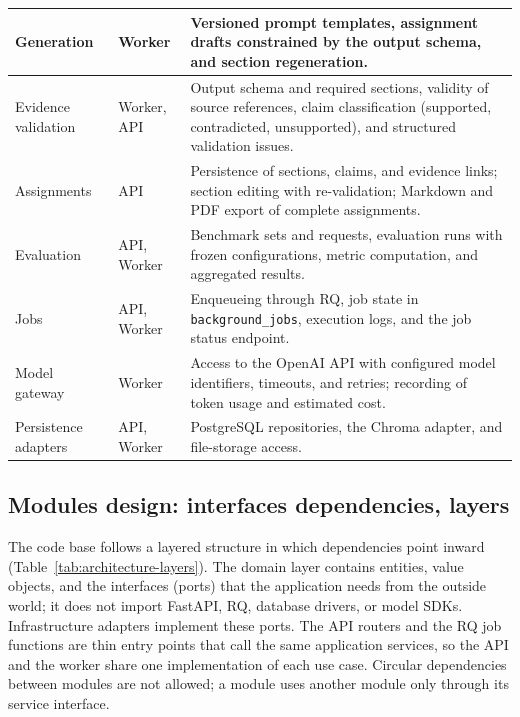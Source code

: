 \documentclass[12pt,a4paper]{article}
\begin{document}
\begin{xltabular}{\textwidth}{
    |p{32mm}|p{19mm}|X|
}
Generation &
Worker &
Versioned prompt templates, assignment drafts constrained by the
output schema, and section regeneration. \\
\hline

Evidence validation &
Worker, API &
Output schema and required sections, validity of source references,
claim classification (supported, contradicted, unsupported), and
structured validation issues. \\
\hline

Assignments &
API &
Persistence of sections, claims, and evidence links; section editing
with re-validation; Markdown and PDF export of complete
assignments. \\
\hline

Evaluation &
API, Worker &
Benchmark sets and requests, evaluation runs with frozen
configurations, metric computation, and aggregated results. \\
\hline

Jobs &
API, Worker &
Enqueueing through RQ, job state in \texttt{background\_jobs},
execution logs, and the job status endpoint. \\
\hline

Model gateway &
Worker &
Access to the OpenAI API with configured model identifiers,
timeouts, and retries; recording of token usage and estimated
cost. \\
\hline

Persistence adapters &
API, Worker &
PostgreSQL repositories, the Chroma adapter, and file-storage
access. \\
\hline

\end{xltabular}
\endgroup

\subsection{Modules design: interfaces dependencies, layers}
\label{sec:architecture-layers}

The code base follows a layered structure in which dependencies
point inward (Table~\ref{tab:architecture-layers}). The domain layer
contains entities, value objects, and the interfaces (ports) that
the application needs from the outside world; it does not import
FastAPI, RQ, database drivers, or model SDKs. Infrastructure
adapters implement these ports. The API routers and the RQ job
functions are thin entry points that call the same application
services, so the API and the worker share one implementation of
each use case. Circular dependencies between modules are not
allowed; a module uses another module only through its service
interface.
\end{document}
